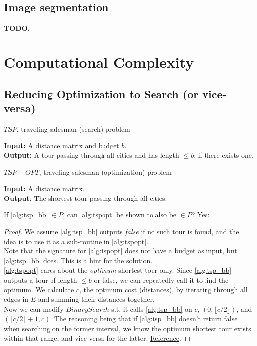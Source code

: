 \documentclass{article}
\theoremstyle{definition}
\begin{document}
\subsection{Image segmentation}
\textbf{TODO.}

\section{Computational Complexity}
\subsection{Reducing Optimization to Search (or vice-versa)}
\begin{algorithm}
	\caption{$TSP$, traveling salesman (search) problem}
	\label{alg:tsp_bb}
	\hspace*{\algorithmicindent} \textbf{Input:} A distance matrix and budget $b$.\\
	\hspace*{\algorithmicindent} \textbf{Output:} A tour passing through all cities and has length $\leq b$, if there exists one.
\end{algorithm}
\begin{algorithm}
	\caption{$TSP-OPT$, traveling salesman (optimization) problem}
	\label{alg:tspopt}
	\hspace*{\algorithmicindent} \textbf{Input:} A distance matrix.\\
	\hspace*{\algorithmicindent} \textbf{Output:} The shortest tour passing through all cities.
\end{algorithm}

If \ref{alg:tsp_bb} $\in P$, can \ref{alg:tspopt} be shown to also be $\in P$? Yes:

\begin{proof}
	We assume \ref{alg:tsp_bb} outputs \textit{false} if no such tour is found, and the idea is to use it as a sub-routine in \ref{alg:tspopt}.\\
	Note that the signature for \ref{alg:tspopt} does not have a budget as input, but \ref{alg:tsp_bb} does. This is a hint for the solution.\\
	\ref{alg:tspopt} cares about the \textit{optimum} shortest tour only. Since \ref{alg:tsp_bb} outputs a tour of length $\leq b$ or false, we can repeatedly call it to find the optimum.
	We calculate $c$, the optimum cost (distances), by iterating through all edges in $E$ and summing their distances together.\\
	Now we can modify $BinarySearch$ s.t. it calls \ref{alg:tsp_bb} on $c$, $(0, \lfloor c/2 \rfloor)$, and $(\lfloor c/2 \rfloor +1, c)$. The reasoning being that if \ref{alg:tsp_bb} doesn't return false when searching on the former interval, we know the optimum shortest tour exists within that range, and vice-versa for the latter. \href{https://cseweb.ucsd.edu/classes/sp08/cse101/hw/hw6soln.pdf}{Reference}.
\end{proof}
\end{document}
